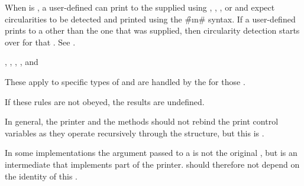 \item{}

When  is ,
a user-defined 
 
can print  to the supplied  
using ,
      ,
      ,
   or 
and expect circularities to be detected 
and printed using the \f{\#\i{n}\#} syntax.
If a user-defined
 
prints to a  other than the one
that was supplied, then circularity detection starts over for that
.  See .

\item{,
      ,
      , 
      ,
  and }

These  apply to specific types of 
and are handled by the  for those .

\endlist
 
If these rules are not obeyed, the results are undefined.
 
In general, the printer and the  methods should not
rebind the print control variables as they operate recursively through the
structure, but this is .
 
In some implementations the  argument passed to a 
  is not the original , 
but is an intermediate  that implements part of the printer.
 should therefore not depend on the identity of this .
 
 
